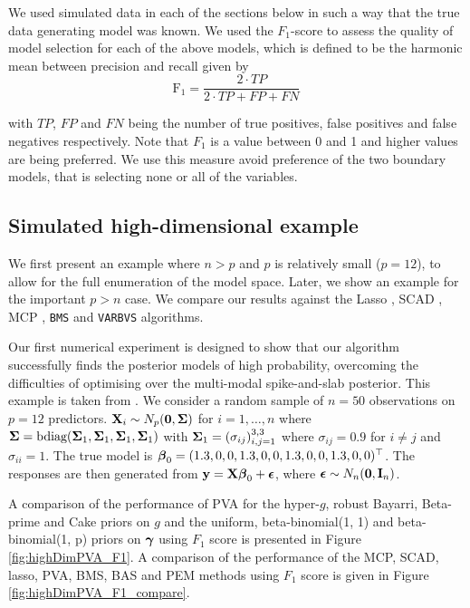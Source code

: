 We used simulated data in each of the sections below in such a way that the true data generating model was known. We used the 
$F_1$-score \citep[see][]{Van_Rijsbergen1979}
to assess the quality of model selection
for each of the above models, which is
defined to be the harmonic mean between precision and recall given by
$$
\mbox{F}_1 = \frac{2\cdot TP}{2\cdot TP + FP + FN}
$$

\noindent
with $TP$, $FP$ and $FN$ being the number of true positives, false
positives and false negatives respectively. Note that $F_1$ is a value between
0 and 1 and higher values are being preferred. We use this measure 
avoid preference of the two boundary models, that is selecting none or all
of the variables. 

\subsection{Simulated high-dimensional example}
\label{sec:highdimensional} 

We first present an example where $n > p$ and $p$ is relatively small ($p = 12$), to allow for the full
enumeration of the model space. Later, we show an example for the important $p > n$ case. We compare our
results  against the Lasso \citep{Tibshirani1996}, SCAD \citep{Fan2001}, MCP \citep{Zhang2010}, {\tt BMS}
\citep{Zeugner2015} and {\tt VARBVS} \citep{Carbonetto2011} algorithms.

Our first numerical experiment is designed to show that our algorithm successfully finds the posterior models
of high probability, overcoming the difficulties of optimising over the multi-modal spike-and-slab posterior.
This example is taken from \citep{Rockova2017}. 
We consider a random sample of $n = 50$ observations on $p = 12$ predictors. ${\bf X}_i \sim N_p({\bf 0}, {\boldsymbol \Sigma})$
for $i = 1, \ldots, n$ where
${\boldsymbol \Sigma} = \text{bdiag}({\boldsymbol \Sigma}_1, {\boldsymbol \Sigma}_1, {\boldsymbol \Sigma}_1, {\boldsymbol \Sigma}_1)$ with
${\boldsymbol \Sigma}_1 = (\sigma_{ij})_{i, j = 1}^{3, 3}$ where $\sigma_{ij} = 0.9$ for $i \ne j$ and $\sigma_{ii} = 1$.
The true model is ${\boldsymbol \beta}_0 = (1.3, 0, 0, 1.3, 0, 0, 1.3, 0, 0, 1.3, 0, 0)^\top$.
The responses are then generated from ${\bf y} = {\bf X} {\boldsymbol \beta}_0 + {\boldsymbol \epsilon}$, where
${\boldsymbol \epsilon} \sim N_n({\bf 0}, {\bf I}_n)$.

A comparison of the performance of PVA for the hyper-$g$, robust Bayarri, Beta-prime and Cake priors on $g$
and the uniform, beta-binomial(1, 1) and beta-binomial(1, p) priors on ${\boldsymbol \gamma}$ using $F_1$ score is
presented in Figure \ref{fig:highDimPVA_F1}. A comparison of the performance of the MCP, SCAD, lasso, PVA, BMS,
BAS and PEM  methods using $F_1$ score is given in Figure \ref{fig:highDimPVA_F1_compare}.

